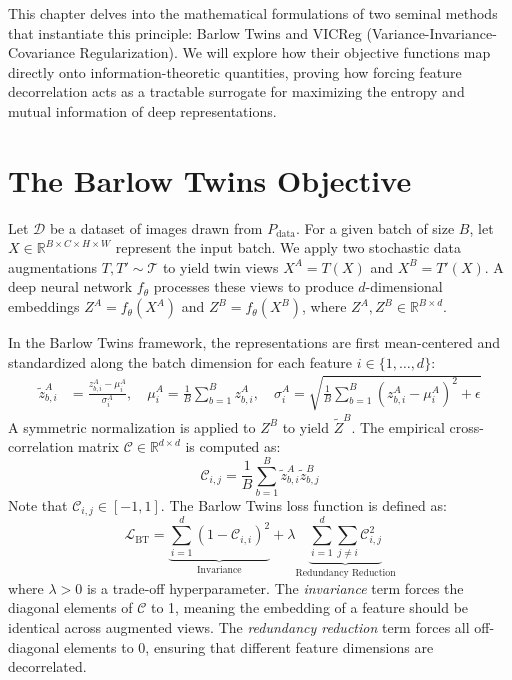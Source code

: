 This chapter delves into the mathematical formulations of two seminal methods that instantiate this principle: Barlow Twins and VICReg (Variance-Invariance-Covariance Regularization). We will explore how their objective functions map directly onto information-theoretic quantities, proving how forcing feature decorrelation acts as a tractable surrogate for maximizing the entropy and mutual information of deep representations.

\section{The Barlow Twins Objective}

Let $\mathcal{D}$ be a dataset of images drawn from $P_{\text{data}}$. For a given batch of size $B$, let $X \in \mathbb{R}^{B \times C \times H \times W}$ represent the input batch. We apply two stochastic data augmentations $T, T' \sim \mathcal{T}$ to yield twin views $X^A = T(X)$ and $X^B = T'(X)$. A deep neural network $f_\theta$ processes these views to produce $d$-dimensional embeddings $Z^A = f_\theta(X^A)$ and $Z^B = f_\theta(X^B)$, where $Z^A, Z^B \in \mathbb{R}^{B \times d}$.

In the Barlow Twins framework, the representations are first mean-centered and standardized along the batch dimension for each feature $i \in \{1, \dots, d\}$:
\begin{align}
    \tilde{z}^A_{b,i} &= \frac{z^A_{b,i} - \mu^A_i}{\sigma^A_i}, \quad \mu^A_i = \frac{1}{B}\sum_{b=1}^B z^A_{b,i}, \quad \sigma^A_i = \sqrt{\frac{1}{B}\sum_{b=1}^B (z^A_{b,i} - \mu^A_i)^2 + \epsilon}
\end{align}
A symmetric normalization is applied to $Z^B$ to yield $\tilde{Z}^B$. The empirical cross-correlation matrix $\mathcal{C} \in \mathbb{R}^{d \times d}$ is computed as:
\begin{equation}
    \mathcal{C}_{i,j} = \frac{1}{B} \sum_{b=1}^B \tilde{z}^A_{b,i} \tilde{z}^B_{b,j}
\end{equation}
Note that $\mathcal{C}_{i,j} \in [-1, 1]$. The Barlow Twins loss function is defined as:
\begin{equation}
    \mathcal{L}_{\text{BT}} = \underbrace{\sum_{i=1}^d (1 - \mathcal{C}_{i,i})^2}_{\text{Invariance}} + \lambda \underbrace{\sum_{i=1}^d \sum_{j \neq i} \mathcal{C}_{i,j}^2}_{\text{Redundancy Reduction}}
\end{equation}
where $\lambda > 0$ is a trade-off hyperparameter. The \emph{invariance} term forces the diagonal elements of $\mathcal{C}$ to 1, meaning the embedding of a feature should be identical across augmented views. The \emph{redundancy reduction} term forces all off-diagonal elements to 0, ensuring that different feature dimensions are decorrelated.

